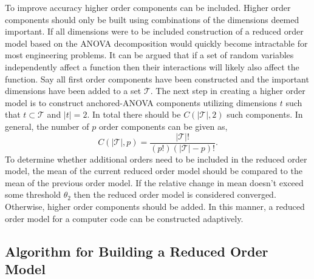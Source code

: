 To improve accuracy higher order components can be included. Higher order components should only be built using combinations of the dimensions deemed important. If all dimensions were to be included construction of a reduced order model based on the \ac{ANOVA} decomposition would quickly become intractable for most engineering problems. It can be argued that if a set of random variables independently affect a function then their interactions will likely also affect the function. Say all first order components have been constructed and the important dimensions have been added to a set $\mathcal{T}$. The next step in creating a higher order model is to construct anchored-\ac{ANOVA} components utilizing dimensions $t$ such that $t\subset\mathcal{T}$ and $\vert t\vert=2$. In total there should be $C(\vert\mathcal{T}\vert,2)$ such components. In general, the number of $p$ order components can be given as,
\begin{equation} \label{eq:num_components_rom_order_p}
   C(\vert\mathcal{T}\vert,p) = \frac{\vert\mathcal{T}\vert!}{
    (p!)(\vert\mathcal{T}\vert-p)!}.
\end{equation}
To determine whether additional orders need to be included in the reduced order model, the mean of the current reduced order model should be compared to the mean of the previous order model. If the relative change in mean doesn't exceed some threshold $\theta_2$ then the reduced order model is considered converged. Otherwise, higher order components should be added. In this manner, a reduced order model for a computer code can be constructed adaptively.    

\subsection{Algorithm for Building a Reduced Order Model} \label{subsec:full_algorithm}

